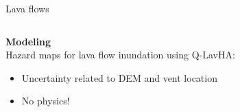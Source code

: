 \documentclass[10pt,aspectratio=169]{beamer}
\begin{document}
\begin{frame}[t]{Lava flows}
    \begin{columns}[T]
        \begin{column}{0.5\textwidth}	
            \textbf{Modeling} \\ \vspace*{1em} 
            Hazard maps for lava flow inundation using \alert{Q-LavHA}: 
            \begin{itemize}
                \item Uncertainty related to \alert{DEM} and \alert{vent location}
                \item No \alert{physics}!
            \end{itemize}

        \end{column}
  

\end{columns}
\end{frame}
\end{document}
